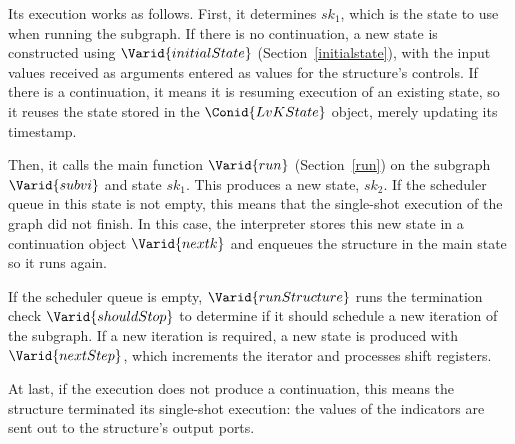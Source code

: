 Its execution works as follows. First, it determines \ensuremath{sk_{1}}, which is the
state to use when running the subgraph. If there is no continuation, a new
state is constructed using \ensuremath{\Varid{initialState}} (Section~\ref{initialstate}), with
the input values received as arguments entered as values for the structure's
controls. If there is a continuation, it means it is resuming execution of an
existing state, so it reuses the state stored in the \ensuremath{\Conid{LvKState}} object,
merely updating its timestamp.

Then, it calls the main function \ensuremath{\Varid{run}} (Section~\ref{run}) on the subgraph
\ensuremath{\Varid{subvi}} and state \ensuremath{sk_{1}}. This produces a new state, \ensuremath{sk_{2} }. If the
scheduler queue in this state is not empty, this means that the single-shot
execution of the graph did not finish. In this case, the interpreter stores
this new state in a continuation object \ensuremath{\Varid{nextk}} and enqueues the structure
in the main state so it runs again.

If the scheduler queue is empty, \ensuremath{\Varid{runStructure}} runs the termination check
\ensuremath{\Varid{shouldStop}} to determine if it should schedule a new iteration of the
subgraph. If a new iteration is required, a new state is produced with
\ensuremath{\Varid{nextStep}}, which increments the iterator and processes shift registers.

At last, if the execution does not produce a continuation, this means the
structure terminated its single-shot execution: the values of the indicators
are sent out to the structure's output ports.

